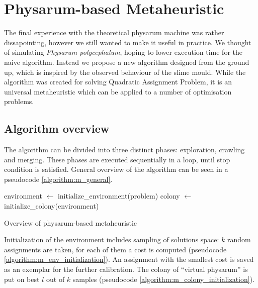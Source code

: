 \section{Physarum-based Metaheuristic}
\label{section:algorithm_metaheuristic}

The final experience with the theoretical physarum machine was rather dissapointing, however we still wanted to make it useful in practice. We thought of simulating \textit{Physarum polycephalum}, hoping to lower execution time for the naive algorithm. Instead we propose a new algorithm designed from the ground up, which is inspired by the observed behaviour of the slime mould. While the algorithm was created for solving Quadratic Assignment Problem, it is an universal metaheuristic which can be applied to a number of optimisation problems.


\subsection{Algorithm overview}

The algorithm can be divided into three distinct phases: exploration, crawling and merging. These phases are executed sequentially in a loop, until stop condition is satisfied. General overview of the algorithm can be seen in a pseudocode \ref{algorithm:m_general}. 

\begin{algorithm}[H]
  \BlankLine

  environment $\leftarrow$ initialize\_environment(problem)\;
  colony $\leftarrow$ initialize\_colony(environment)\;


  \;

  \caption{Overview of physarum-based metaheuristic}
  \label{algorithm:m_general}
\end{algorithm}

Initialization of the environment includes sampling of solutions space: $k$ random assignments are taken, for each of them a cost is computed (pseudocode \ref{algorithm:m_env_initialization}). An assignment with the smallest cost is saved as an exemplar for the further calibration.  The colony of ``virtual physarum'' is put on best $l$ out of $k$ samples (pseudocode \ref{algorithm:m_colony_initialization}).

